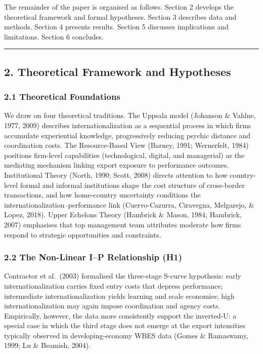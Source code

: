 \documentclass[
  12pt,a4paper]{article}
\begin{document}
The remainder of the paper is organised as follows. Section 2 develops
the theoretical framework and formal hypotheses. Section 3 describes
data and methods. Section 4 presents results. Section 5 discusses
implications and limitations. Section 6 concludes.

\begin{center}\rule{0.5\linewidth}{0.5pt}\end{center}

\hypertarget{theoretical-framework-and-hypotheses}{%
\subsection{2. Theoretical Framework and
Hypotheses}\label{theoretical-framework-and-hypotheses}}

\hypertarget{theoretical-foundations}{%
\subsubsection{2.1 Theoretical
Foundations}\label{theoretical-foundations}}

We draw on four theoretical traditions. The Uppsala model (Johanson \&
Vahlne, 1977, 2009) describes internationalization as a sequential
process in which firms accumulate experiential knowledge, progressively
reducing psychic distance and coordination costs. The Resource-Based
View (Barney, 1991; Wernerfelt, 1984) positions firm-level capabilities
(technological, digital, and managerial) as the mediating mechanism
linking export exposure to performance outcomes. Institutional Theory
(North, 1990; Scott, 2008) directs attention to how country-level formal
and informal institutions shape the cost structure of cross-border
transactions, and how home-country uncertainty conditions the
internationalization--performance link (Cuervo-Cazurra, Ciravegna,
Melgarejo, \& Lopez, 2018). Upper Echelons Theory (Hambrick \& Mason,
1984; Hambrick, 2007) emphasises that top management team attributes
moderate how firms respond to strategic opportunities and constraints.

\hypertarget{the-non-linear-ip-relationship-h1}{%
\subsubsection{2.2 The Non-Linear I--P Relationship
(H1)}\label{the-non-linear-ip-relationship-h1}}

Contractor et al.~(2003) formalised the three-stage S-curve hypothesis:
early internationalization carries fixed entry costs that depress
performance; intermediate internationalization yields learning and scale
economies; high internationalization may again impose coordination and
agency costs. Empirically, however, the data more consistently support
the inverted-U: a special case in which the third stage does not emerge
at the export intensities typically observed in developing-economy WBES
data (Gomes \& Ramaswamy, 1999; Lu \& Beamish, 2004).
\end{document}
